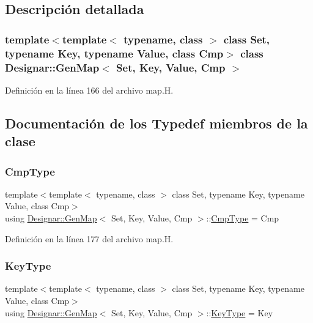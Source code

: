 \subsection{Descripción detallada}
\subsubsection*{template$<$template$<$ typename, class $>$ class Set, typename Key, typename Value, class Cmp$>$\newline
class Designar\+::\+Gen\+Map$<$ Set, Key, Value, Cmp $>$}



Definición en la línea 166 del archivo map.\+H.



\subsection{Documentación de los \textquotesingle{}Typedef\textquotesingle{} miembros de la clase}
\mbox{\label{class_designar_1_1_gen_map_ac80521be38e4e808bcbeb7041da7d813}} 
\subsubsection{\texorpdfstring{Cmp\+Type}{CmpType}}
{\footnotesize\ttfamily template$<$template$<$ typename, class $>$ class Set, typename Key, typename Value, class Cmp$>$ \\
using \hyperlink{class_designar_1_1_gen_map}{Designar\+::\+Gen\+Map}$<$ Set, Key, Value, Cmp $>$\+::\hyperlink{class_designar_1_1_gen_map_ac80521be38e4e808bcbeb7041da7d813}{Cmp\+Type} =  Cmp}



Definición en la línea 177 del archivo map.\+H.

\mbox{\label{class_designar_1_1_gen_map_aeb697a86f4ad13eadc36bf5cc967f26f}} 
\subsubsection{\texorpdfstring{Key\+Type}{KeyType}}
{\footnotesize\ttfamily template$<$template$<$ typename, class $>$ class Set, typename Key, typename Value, class Cmp$>$ \\
using \hyperlink{class_designar_1_1_gen_map}{Designar\+::\+Gen\+Map}$<$ Set, Key, Value, Cmp $>$\+::\hyperlink{class_designar_1_1_gen_map_aeb697a86f4ad13eadc36bf5cc967f26f}{Key\+Type} =  Key}



